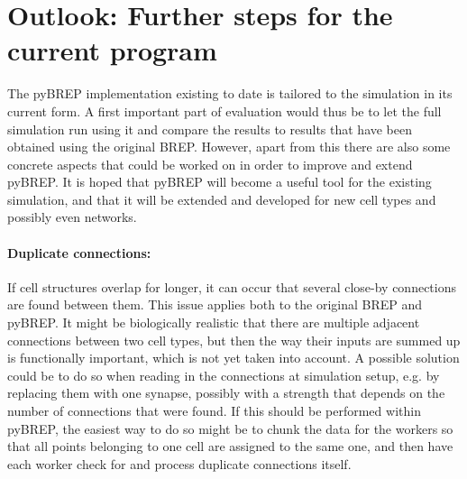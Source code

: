 \documentclass[12pt]{report}
\begin{document}
\section{Outlook: Further steps for the current program}
\label{s:todo}
The pyBREP implementation existing to date is tailored to the simulation in its current form. A first important part of evaluation would thus be to let the full simulation run using it and compare the results to results that have been obtained using the original BREP. However, apart from this there are also some concrete aspects that could be worked on in order to improve and extend pyBREP. It is hoped that pyBREP will become a useful tool for the existing simulation, and that it will be extended and developed for new cell types and possibly even networks. 


\paragraph*{Duplicate connections:} If cell structures overlap for longer, it can occur that several close-by connections are found between them. This issue applies both to the original BREP and pyBREP. It might be biologically realistic that there are multiple adjacent connections between two cell types, but then the way their inputs are summed up is functionally important, which is not yet taken into account. A possible solution could be to do so when reading in the connections at simulation setup, e.g. by replacing them with one synapse, possibly with a strength that depends on the number of connections that were found.
If this should be performed within pyBREP, the easiest way to do so might be to chunk the data for the workers so that all points belonging to one cell are assigned to the same one, and then have each worker check for and process duplicate connections itself. 
\end{document}
